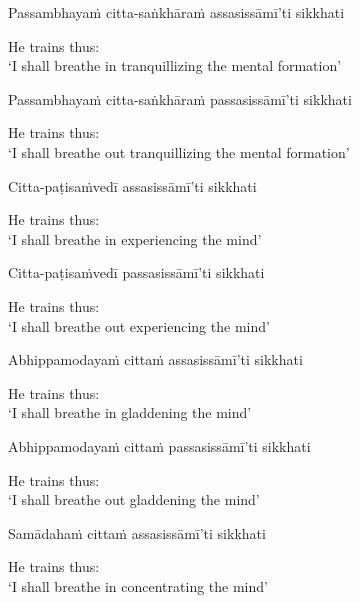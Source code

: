 Passambhayaṁ citta-saṅkhāraṁ assasissāmī'ti sikkhati

\begin{english}
  He trains thus:\\
  `I shall breathe in tranquillizing the mental formation'\ifdigitalversion\makeatletter\hyperlink{endnote70-appendix}\makeatother\fi
\end{english}

Passambhayaṁ citta-saṅkhāraṁ passasissāmī'ti sikkhati

\begin{english}
  He trains thus:\\
  `I shall breathe out tranquillizing the mental formation'
\end{english}

Citta-paṭisaṁvedī assasissāmī'ti sikkhati

\begin{english}
  He trains thus:\\
  `I shall breathe in experiencing the mind'
\end{english}

Citta-paṭisaṁvedī passasissāmī'ti sikkhati

\begin{english}
  He trains thus:\\
  `I shall breathe out experiencing the mind'
\end{english}

Abhippamodayaṁ cittaṁ assasissāmī'ti sikkhati

\begin{english}
  He trains thus:\\
  `I shall breathe in gladdening the mind'
\end{english}

Abhippamodayaṁ cittaṁ passasissāmī'ti sikkhati

\begin{english}
  He trains thus:\\
  `I shall breathe out gladdening the mind'
\end{english}

Samādahaṁ cittaṁ assasissāmī'ti sikkhati

\ifbfiveversion\clearpage\fi

\begin{english}
  He trains thus:\\
  `I shall breathe in concentrating the mind'
\end{english}

